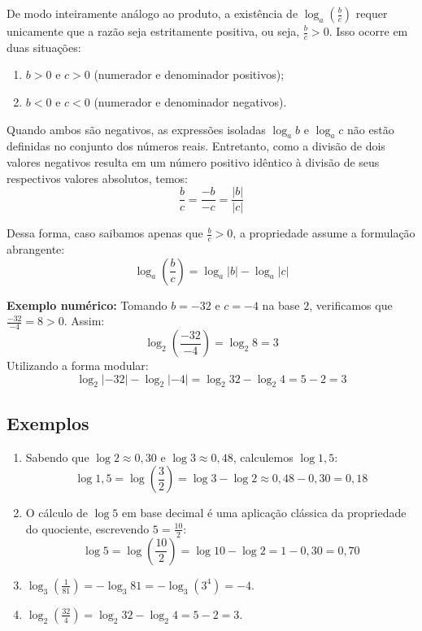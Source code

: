\documentclass[12pt,a4paper]{report}
\begin{document}
	\begin{destaque}
		De modo inteiramente análogo ao produto, a existência de $\log_a \left(\frac{b}{c}\right)$ requer unicamente que a razão seja estritamente positiva, ou seja, $\frac{b}{c} > 0$. Isso ocorre em duas situações:
		\begin{enumerate}[label=\alph*)]
			\item $b > 0$ e $c > 0$ (numerador e denominador positivos);
			\item $b < 0$ e $c < 0$ (numerador e denominador negativos).
		\end{enumerate}
		
		Quando ambos são negativos, as expressões isoladas $\log_a b$ e $\log_a c$ não estão definidas no conjunto dos números reais. Entretanto, como a divisão de dois valores negativos resulta em um número positivo idêntico à divisão de seus respectivos valores absolutos, temos:
		$$\frac{b}{c} = \frac{-b}{-c} = \frac{|b|}{|c|}$$
		
		Dessa forma, caso saibamos apenas que $\frac{b}{c} > 0$, a propriedade assume a formulação abrangente:
		$$\log_a \left(\frac{b}{c}\right) = \log_a |b| - \log_a |c|$$
		
		\textbf{Exemplo numérico:}  
		Tomando $b = -32$ e $c = -4$ na base $2$, verificamos que $\frac{-32}{-4} = 8 > 0$. Assim:
		$$\log_2 \left(\frac{-32}{-4}\right) = \log_2 8 = 3$$
		Utilizando a forma modular:
		$$\log_2 |-32| - \log_2 |-4| = \log_2 32 - \log_2 4 = 5 - 2 = 3$$
	\end{destaque}
	
	\subsection*{Exemplos}
	
	\begin{enumerate}[label=\textbf{\alph*)}]
		\item Sabendo que $\log 2 \approx 0{,}30$ e $\log 3 \approx 0{,}48$, calculemos $\log 1{,}5$:
		$$\log 1{,}5 = \log\left(\frac{3}{2}\right) = \log 3 - \log 2 \approx 0{,}48 - 0{,}30 = 0{,}18$$
		
		\item O cálculo de $\log 5$ em base decimal é uma aplicação clássica da propriedade do quociente, escrevendo $5 = \frac{10}{2}$:
		$$\log 5 = \log\left(\frac{10}{2}\right) = \log 10 - \log 2 = 1 - 0{,}30 = 0{,}70$$
		
		\item $\log_3 \left(\frac{1}{81}\right) = -\log_3 81 = -\log_3 (3^4) = -4$.
		
		\item $\log_2 \left(\frac{32}{4}\right) = \log_2 32 - \log_2 4 = 5 - 2 = 3$.
	\end{enumerate}
\end{document}

